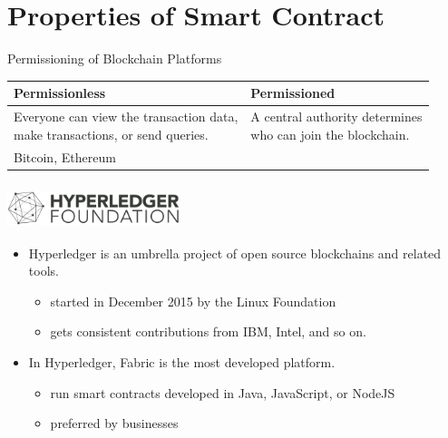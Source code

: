 \documentclass[xcolor=svgnames]{beamer}
\begin{document}
\section[Smart Contract]{Properties of Smart Contract}
\begin{frame}{Permissioning of Blockchain Platforms}

\begin{table}
\small
\renewcommand*{\arraystretch}{2}
\begin{tabular}{ll}
Permissionless                                                              & Permissioned                                                \\ \hline
\makecell[l]{Everyone can view the transaction data, \\make transactions, or send queries.} & \makecell[l]{A central authority determines \\who can join the blockchain.} \\
Bitcoin, Ethereum                                                           & \onslide<2->{Hyperledger Fabric}                                          \\
\end{tabular}
\end{table}

\end{frame}

\begin{frame}
\frametitle{
\includegraphics[height=1cm]{hyperledgerfoundation_horizontal-dark.png}
\qquad
{}
}

\begin{itemize}
\item Hyperledger is an umbrella project of open source blockchains and related tools.
\begin{itemize}
\item started in December 2015 by the Linux Foundation
\item gets consistent contributions from IBM, Intel, and so on.
\end{itemize}

\item<2-> In Hyperledger, Fabric is the most developed platform.
\begin{itemize}
\item run smart contracts developed in Java, JavaScript, or NodeJS
\item preferred by businesses
\end{itemize}
\end{itemize}
\end{frame}
\end{document}
